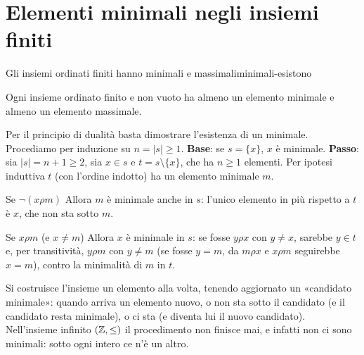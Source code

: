 \section{Elementi minimali negli insiemi finiti}\label{sec:minimali-finiti}

\begin{concetto}
\begin{Teorema}{Gli insiemi ordinati finiti hanno minimali e massimali}{minimali-esistono}
    \begin{prerequisiti}
    \end{prerequisiti}
    Ogni insieme ordinato finito e non vuoto ha almeno un elemento minimale e almeno un elemento massimale.
\end{Teorema}
\begin{dimostrazione}
    Per il principio di dualità basta dimostrare l'esistenza di un minimale. Procediamo per induzione su $n = |s| \geq 1$.
    \textbf{Base}: se $s = \{x\}$, $x$ è minimale. \textbf{Passo}: sia $|s| = n + 1 \geq 2$, sia $x \in s$ e $t = s \setminus \{x\}$, che ha $n \geq 1$
    elementi. Per ipotesi induttiva $t$ (con l'ordine indotto) ha un elemento minimale $m$.
    \begin{caso}{Se $\neg(x \rho m)$}
        Allora $m$ è minimale anche in $s$: l'unico elemento in più rispetto a $t$ è $x$, che non sta sotto $m$.
    \end{caso}
    \begin{caso}{Se $x \rho m$ (e $x \neq m$)}
        Allora $x$ è minimale in $s$: se fosse $y \rho x$ con $y \neq x$, sarebbe $y \in t$ e, per transitività, $y \rho m$ con $y \neq m$
        (se fosse $y = m$, da $m \rho x$ e $x \rho m$ seguirebbe $x = m$), contro la minimalità di $m$ in $t$.
    \end{caso}
\end{dimostrazione}
\end{concetto}

\begin{spiegazione}
    Si costruisce l'insieme un elemento alla volta, tenendo aggiornato un «candidato minimale»: quando arriva un elemento nuovo,
    o non sta sotto il candidato (e il candidato resta minimale), o ci sta (e diventa lui il nuovo candidato). Nell'insieme
    infinito $(\mathbb{Z}, \leq)$ il procedimento non finisce mai, e infatti non ci sono minimali: sotto ogni intero ce n'è un altro.
\end{spiegazione}

